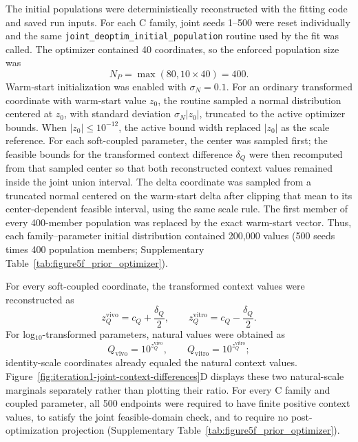\documentclass[11pt]{article}
\begin{document}
The initial populations were deterministically reconstructed with the fitting code and saved run inputs. For each C family, joint seeds 1--500 were reset individually and the same \texttt{joint\_\allowbreak deoptim\_\allowbreak initial\_\allowbreak population} routine used by the fit was called. The optimizer contained 40 coordinates, so the enforced population size was
\[
N_P=\max(80,10\times40)=400.
\]
Warm-start initialization was enabled with \(\sigma_N=0.1\). For an ordinary transformed coordinate with warm-start value \(z_0\), the routine sampled a normal distribution centered at \(z_0\), with standard deviation \(\sigma_N|z_0|\), truncated to the active optimizer bounds. When \(|z_0|\le10^{-12}\), the active bound width replaced \(|z_0|\) as the scale reference. For each soft-coupled parameter, the center was sampled first; the feasible bounds for the transformed context difference \(\delta_Q\) were then recomputed from that sampled center so that both reconstructed context values remained inside the joint union interval. The delta coordinate was sampled from a truncated normal centered on the warm-start delta after clipping that mean to its center-dependent feasible interval, using the same scale rule. The first member of every 400-member population was replaced by the exact warm-start vector. Thus, each family--parameter initial distribution contained 200,000 values (500 seeds times 400 population members; Supplementary Table~\ref{tab:figure5f_prior_optimizer}).

For every soft-coupled coordinate, the transformed context values were reconstructed as
\begin{equation}
z_Q^{\mathrm{vivo}}=c_Q+\frac{\delta_Q}{2},
\qquad
z_Q^{\mathrm{vitro}}=c_Q-\frac{\delta_Q}{2}.
\label{eq:appendix_figure5f_context_reconstruction}
\end{equation}
For log$_{10}$-transformed parameters, natural values were obtained as
\begin{equation}
Q_{\mathrm{vivo}}=10^{z_Q^{\mathrm{vivo}}},
\qquad
Q_{\mathrm{vitro}}=10^{z_Q^{\mathrm{vitro}}};
\label{eq:appendix_figure5f_log_inverse}
\end{equation}
identity-scale coordinates already equaled the natural context values. Figure~\ref{fig:iteration1-joint-context-differences}D displays these two natural-scale marginals separately rather than plotting their ratio. For every C family and coupled parameter, all 500 endpoints were required to have finite positive context values, to satisfy the joint feasible-domain check, and to require no post-optimization projection (Supplementary Table~\ref{tab:figure5f_prior_optimizer}).
\end{document}
